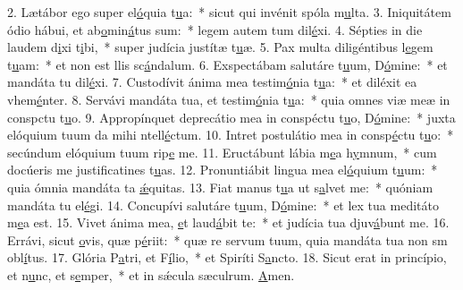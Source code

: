 2. Lætábor ego super el\uline{ó}quia t\uline{u}a:~* sicut qui invénit spóla m\uline{u}lta.
3. Iniquitátem ódio hábui, et ab\uline{o}min\uline{á}tus sum:~* legem autem tum dil\uline{é}xi.
4. Sépties in die laudem d\uline{i}xi t\uline{i}bi,~* super judícia justítæ t\uline{u}æ.
5. Pax multa diligéntibus l\uline{e}gem t\uline{u}am:~* et non est llis sc\uline{á}ndalum.
6. Exspectábam salutáre t\uline{u}um, D\uline{ó}mine:~* et mandáta tu dil\uline{é}xi.
7. Custodívit ánima mea testim\uline{ó}nia t\uline{u}a:~* et diléxit ea vhem\uline{é}nter.
8. Servávi mandáta tua, et testim\uline{ó}nia t\uline{u}a:~* quia omnes viæ meæ in conspctu t\uline{u}o.
9. Appropínquet deprecátio mea in conspéctu t\uline{u}o, D\uline{ó}mine:~* juxta elóquium tuum da mihi ntell\uline{é}ctum.
10. Intret postulátio mea in consp\uline{é}ctu t\uline{u}o:~* secúndum elóquium tuum rip\uline{e} me.
11. Eructábunt lábia m\uline{e}a h\uline{y}mnum,~* cum docúeris me justificatines t\uline{u}as.
12. Pronuntiábit lingua mea el\uline{ó}quium t\uline{u}um:~* quia ómnia mandáta ta \uline{ǽ}quitas.
13. Fiat manus t\uline{u}a ut s\uline{a}lvet me:~* quóniam mandáta tu el\uline{é}gi.
14. Concupívi salutáre t\uline{u}um, D\uline{ó}mine:~* et lex tua meditáto m\uline{e}a est.
15. Vivet ánima mea, \uline{e}t laud\uline{á}bit te:~* et judícia tua djuv\uline{á}bunt me.
16. Errávi, sicut \uline{o}vis, quæ p\uline{é}riit:~* quæ re servum tuum, quia mandáta tua non sm obl\uline{í}tus.
17. Glória P\uline{a}tri, et F\uline{í}lio,~* et Spiríti S\uline{a}ncto.
18. Sicut erat in princípio, et n\uline{u}nc, et s\uline{e}mper,~* et in sǽcula sæculrum. \uline{A}men.
